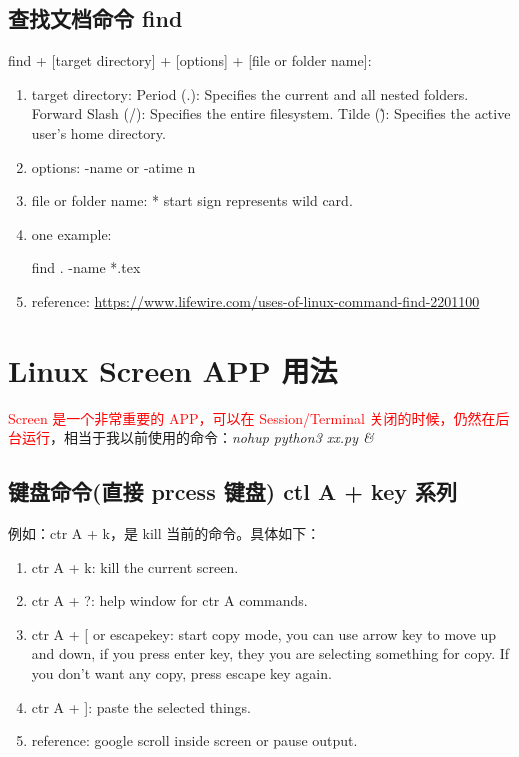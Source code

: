 \documentclass[UTF8,fancyhdr,a4paper]{ctexart}
\newcommand{\pflred}[1]{\textcolor{red}{#1}}
\begin{document}
\subsection{查找文档命令 find}

find + [target directory] + [options] + [file or folder name]:
\begin{enumerate}
\item
target directory:
Period (.): Specifies the current and all nested folders.
Forward Slash (/): Specifies the entire filesystem.
Tilde (\~): Specifies the active user's home directory.
\item
options:
-name or -atime n
\item
file or folder name:
* start sign represents wild card.
\item
one example:

find . -name *.tex
\item
reference:
\url	{https://www.lifewire.com/uses-of-linux-command-find-2201100}


\end{enumerate}



\newpage

\section{Linux Screen APP 用法}
\pflred{Screen 是一个非常重要的 APP，可以在 Session/Terminal 关闭的时候，仍然在后台运行}，相当于我以前使用的命令：\textit{nohup python3 xx.py \&}
\subsection{键盘命令(直接 prcess 键盘) ctl A + key 系列}
例如：ctr A + k，是 kill 当前的命令。具体如下：
\begin{enumerate}
\item ctr A + k: kill the current screen.
\item ctr A + ?: help window for ctr A commands.
\item ctr A + [ or escapekey: start copy mode, you can use arrow key to move up and down, if you press enter key, they you are selecting something for copy. If you don't want any copy, press escape key again.
\item ctr A + ]: paste the selected things.
\item reference: google scroll inside screen or pause output.
\end{enumerate}
\end{document}
